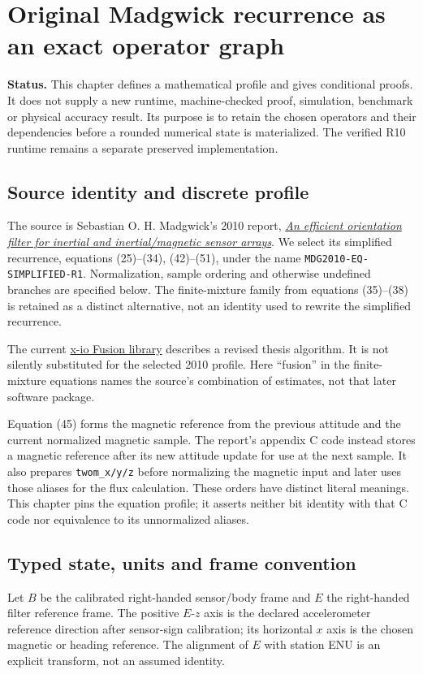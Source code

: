 \section{Original Madgwick recurrence as an exact operator graph}
\label{sec:exact-madgwick}

\begin{panel}
\textbf{Status.} This chapter defines a mathematical profile and gives conditional
proofs. It does not supply a new runtime, machine-checked proof, simulation,
benchmark or physical accuracy result. Its purpose is to retain the chosen
operators and their dependencies before a rounded numerical state is materialized.
The verified R10 runtime remains a separate preserved implementation.
\end{panel}

\subsection{Source identity and discrete profile}
The source is Sebastian O. H. Madgwick's 2010 report,
\href{https://x-io.co.uk/downloads/madgwick_internal_report.pdf}{\emph{An efficient
orientation filter for inertial and inertial/magnetic sensor arrays}}.
We select its simplified recurrence, equations (25)--(34), (42)--(51), under the
name \texttt{MDG2010-EQ-SIMPLIFIED-R1}. Normalization, sample ordering and
otherwise undefined branches are specified below. The finite-mixture family
from equations (35)--(38) is retained as a distinct alternative, not an identity
used to rewrite the simplified recurrence.

The current \href{https://github.com/xioTechnologies/Fusion}{x-io Fusion library}
describes a revised thesis algorithm. It is not silently substituted for the
selected 2010 profile. Here ``fusion'' in the finite-mixture equations names the
source's combination of estimates, not that later software package.

Equation (45) forms the magnetic reference from the previous attitude and the
current normalized magnetic sample. The report's appendix C code instead stores
a magnetic reference after its new attitude update for use at the next sample.
It also prepares \texttt{twom\_x/y/z} before normalizing the magnetic input and
later uses those aliases for the flux calculation. These orders have distinct
literal meanings. This chapter pins the equation profile; it asserts neither
bit identity with that C code nor equivalence to its unnormalized aliases.

\subsection{Typed state, units and frame convention}
Let $B$ be the calibrated right-handed sensor/body frame and $E$ the right-handed
filter reference frame. The positive $E$-$z$ axis is the declared accelerometer
reference direction after sensor-sign calibration; its horizontal $x$ axis is
the chosen magnetic or heading reference. The alignment of $E$ with station ENU
is an explicit transform, not an assumed identity.

